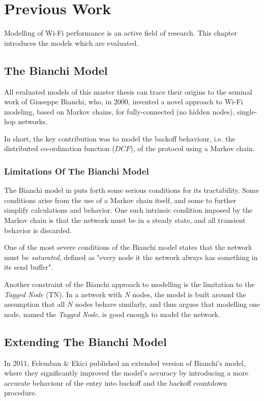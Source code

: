 \chapter{Previous Work}

Modelling of Wi-Fi performance is an active field of research. This chapter introduces the models which are evaluated.

\section{The Bianchi Model}

All evaluated models of this master thesis can trace their origins to the seminal work of Giuseppe Bianchi, who, in 2000, invented a novel approach to Wi-Fi modeling, based on Markov chains\cite{bianchi}, for fully-connected (no hidden nodes), single-hop networks.

In short, the key contribution was to model the backoff behaviour, i.e. the distributed co-ordination function ($DCF$), of the protocol using a Markov chain.

\subsection{Limitations Of The Bianchi Model}
The Bianchi model in \cite{bianchi} puts forth some serious conditions for its tractability. Some conditions arise from the use of a Markov chain itself, and some to further simplify calculations and behavior. One such intrinsic condition imposed by the Markov chain is that the network must be in a steady state, and all transient behavior is discarded.

One of the most severe conditions of the Bianchi model states that the network must be \emph{saturated}, defined as "every node it the network always has something in its send buffer".

Another constraint of the Bianchi approach to modelling is the limitation to the \emph{Tagged Node} (TN). In a network with $N$ nodes, the model is built around the assumption that all $N$ nodes behave similarly, and thus argues that modelling one node, named the \emph{Tagged Node}, is good enough to model the network.

\section{Extending The Bianchi Model}

In 2011, Felemban \& Ekici published an extended version of Bianchi's model, where they significantly improved the model's accuracy by introducing a more accurate behaviour of the entry into backoff and the backoff countdown procedure.

